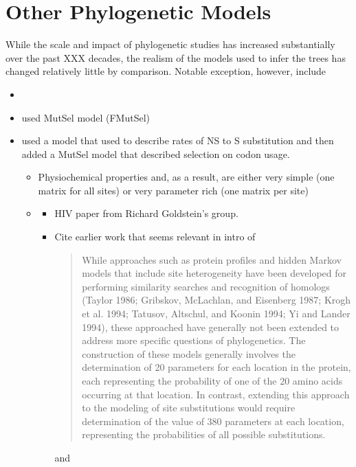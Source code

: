 \section*{Other Phylogenetic Models}
While the scale and impact of phylogenetic studies has increased substantially over the past XXX decades, the realism of the models used to infer the trees has changed relatively little by comparison.
Notable exception, however, include
\begin{itemize}
\item 
\item \citet{MuseAndGaut1994,HalpernAndBruno1998,YangAndNielsen2008} used MutSel model (FMutSel) 
\item \citet{YangAndNielsen2008} used a model that used \citet{GoldmanAndYang1994} to describe rates of NS to S substitution and then added a MutSel model that described selection on codon usage.
  \begin{itemize}
  \item Physiochemical properties and, as a result, are either very simple (one matrix for all sites) or very parameter rich (one matrix per site) \citet{RodrigueEtAl2005} 
  \item \citet{KoshiEtAl1997,KoshiEtAl1999,DimmicEtAl2000}
    \begin{itemize}
    \item HIV paper from Richard Goldstein's group.
    \item Cite earlier work that seems relevant in intro of \citet{KoshiEtAl1999}
      \begin{quote}
        While approaches such as protein profiles and hidden Markov models that include site heterogeneity have been developed for performing similarity searches and recognition of homologs (Taylor 1986; Gribskov, McLachlan, and Eisenberg 1987; Krogh et al. 1994; Tatusov, Altschul, and Koonin 1994; Yi and Lander 1994), these approached have generally not been extended to address more specific questions of phylogenetics. The construction of these models generally involves the determination of 20 parameters for each location in the protein, each representing the probability of one of the 20 amino acids occurring at that location. In contrast, extending this approach to the modeling of site substitutions would require determination of the value of 380 parameters at each location, representing the probabilities of all possible substitutions.
      \end{quote}
      and
      \begin{quote}

\end{quote}
\end{itemize}
\end{itemize}
\end{itemize}
